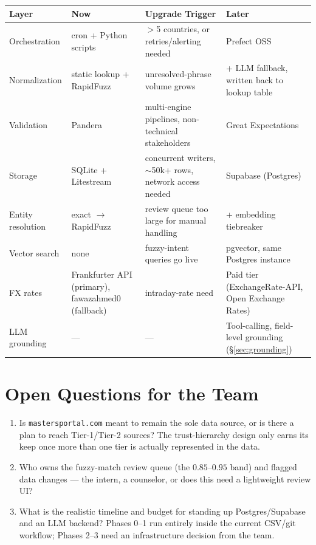 \documentclass[11pt,a4paper]{article}
\begin{document}
\begingroup
\renewcommand{\arraystretch}{1.4}
\begin{center}
\small
\begin{tabular}{@{}L{2.5cm}L{3.3cm}L{3.6cm}L{3.2cm}@{}}
\toprule
\textbf{Layer} & \textbf{Now} & \textbf{Upgrade Trigger} & \textbf{Later} \\
\midrule
Orchestration & cron + Python scripts & $>$5 countries, or retries/alerting needed & Prefect OSS \\
Normalization & static lookup + RapidFuzz & unresolved-phrase volume grows & + LLM fallback, written back to lookup table \\
Validation & Pandera & multi-engine pipelines, non-technical stakeholders & Great Expectations \\
Storage & SQLite + Litestream & concurrent writers, $\sim$50k+ rows, network access needed & Supabase (Postgres) \\
Entity resolution & exact $\to$ RapidFuzz & review queue too large for manual handling & + embedding tiebreaker \\
Vector search & none & fuzzy-intent queries go live & pgvector, same Postgres instance \\
FX rates & Frankfurter API (primary), fawazahmed0 (fallback) & intraday-rate need & Paid tier (ExchangeRate-API, Open Exchange Rates) \\
LLM grounding & --- & --- & Tool-calling, field-level grounding (\S\ref{sec:grounding}) \\
\bottomrule
\end{tabular}
\end{center}
\endgroup

\section{Open Questions for the Team}
\label{sec:open-questions}

\begin{riskbox}
\begin{enumerate}[leftmargin=1.6em, itemsep=4pt]
  \item Is \texttt{mastersportal.com} meant to remain the sole data source, or is there a plan to reach Tier-1/Tier-2 sources? The trust-hierarchy design only earns its keep once more than one tier is actually represented in the data.
  \item Who owns the fuzzy-match review queue (the $0.85$--$0.95$ band) and flagged data changes --- the intern, a counselor, or does this need a lightweight review UI?
  \item What is the realistic timeline and budget for standing up Postgres/Supabase and an LLM backend? Phases 0--1 run entirely inside the current CSV/git workflow; Phases 2--3 need an infrastructure decision from the team.
\end{enumerate}
\end{riskbox}
\end{document}
